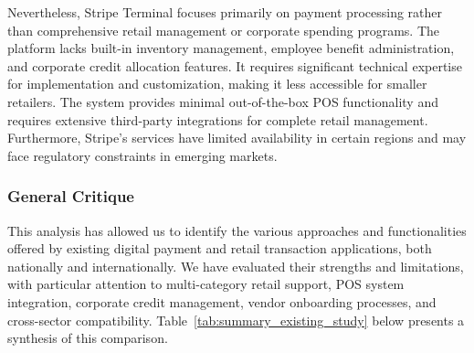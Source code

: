Nevertheless, Stripe Terminal focuses primarily on payment processing rather than comprehensive retail management or corporate spending programs. The platform lacks built-in inventory management, employee benefit administration, and corporate credit allocation features. It requires significant technical expertise for implementation and customization, making it less accessible for smaller retailers. The system provides minimal out-of-the-box POS functionality and requires extensive third-party integrations for complete retail management. Furthermore, Stripe's services have limited availability in certain regions and may face regulatory constraints in emerging markets.

\subsubsection{General Critique}

This analysis has allowed us to identify the various approaches and functionalities offered by existing digital payment and retail transaction applications, both nationally and internationally. We have evaluated their strengths and limitations, with particular attention to multi-category retail support, POS system integration, corporate credit management, vendor onboarding processes, and cross-sector compatibility. Table~\ref{tab:summary_existing_study} below presents a synthesis of this comparison.

